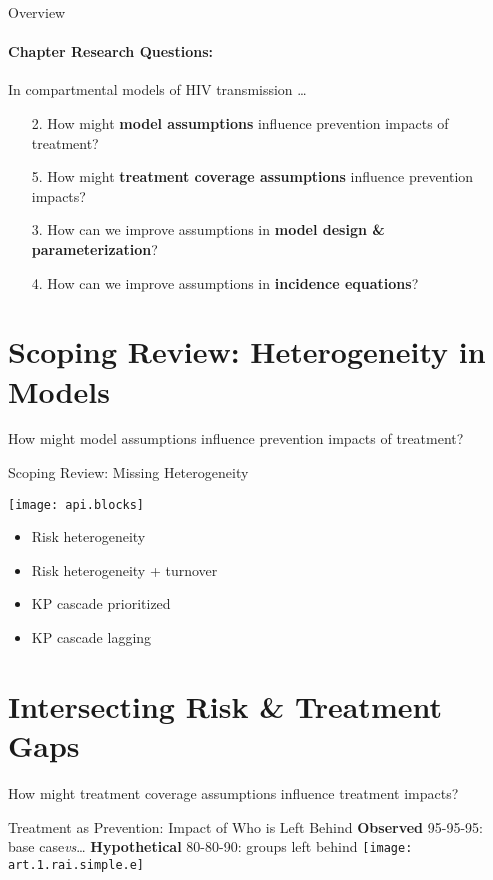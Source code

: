 \begin{frame}{Overview}
  \paragraph{Chapter Research Questions:}
  In compartmental models of HIV transmission \dots\medskip\pause
  \begin{enumerate}[<+->]\setcounter{enumi}{1}\rqstyle
    \item[2.] How might \textbf{model assumptions} influence prevention impacts of treatment?
    \item[5.] How might \textbf{treatment coverage assumptions} influence prevention impacts?
    \item[3.] How can we improve assumptions in \textbf{model design \& parameterization}?
    \item[4.] How can we improve assumptions in \textbf{incidence equations}?
  \end{enumerate}
  \vfill
\end{frame}
\section[2]{Scoping Review: Heterogeneity in Models}
  {How might model assumptions influence prevention impacts of treatment?}
\newcommand{\itemdir}[1]{\item[$\boldsymbol{#1}$]}
\begin{frame}{Scoping Review: Missing Heterogeneity}
  \parbox{.5\textwidth}{\pause%
    \texttt{[image: api.blocks]}}%
  \parbox{.5\textwidth}{
    \pause%
    \begin{itemize}[<+->]
      \itemdir{\sim} Risk heterogeneity
      \itemdir{\downarrow} Risk heterogeneity + turnover
      \itemdir{\uparrow} KP cascade prioritized
      \itemdir{?\downarrow} KP cascade lagging
    \end{itemize}}
\end{frame}
\section[5]{Intersecting Risk \& Treatment Gaps}
  {How might treatment coverage assumptions influence treatment impacts?}
\begin{frame}{Treatment as Prevention: Impact of Who is Left Behind}
  \pause\textbf{Observed} 95-95-95: base case\enspace\emph{vs}\dots
  \pause\textbf{Hypothetical} 80-80-90: groups left behind
  \parpause{}
  \centering\texttt{[image: art.1.rai.simple.e]}
\end{frame}
